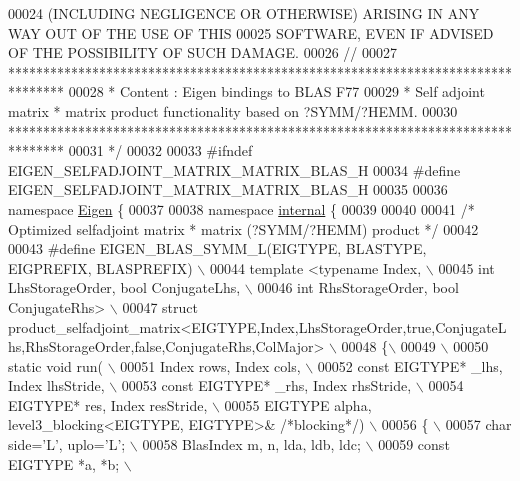 \begin{DoxyCode}
00024 \textcolor{comment}{ (INCLUDING NEGLIGENCE OR OTHERWISE) ARISING IN ANY WAY OUT OF THE USE OF THIS}
00025 \textcolor{comment}{ SOFTWARE, EVEN IF ADVISED OF THE POSSIBILITY OF SUCH DAMAGE.}
00026 \textcolor{comment}{//}
00027 \textcolor{comment}{ ********************************************************************************}
00028 \textcolor{comment}{ *   Content : Eigen bindings to BLAS F77}
00029 \textcolor{comment}{ *   Self adjoint matrix * matrix product functionality based on ?SYMM/?HEMM.}
00030 \textcolor{comment}{ ********************************************************************************}
00031 \textcolor{comment}{*/}
00032 
00033 \textcolor{preprocessor}{#ifndef EIGEN\_SELFADJOINT\_MATRIX\_MATRIX\_BLAS\_H}
00034 \textcolor{preprocessor}{#define EIGEN\_SELFADJOINT\_MATRIX\_MATRIX\_BLAS\_H}
00035 
00036 \textcolor{keyword}{namespace }\hyperlink{namespace_eigen}{Eigen} \{ 
00037 
00038 \textcolor{keyword}{namespace }\hyperlink{namespaceinternal}{internal} \{
00039 
00040 
00041 \textcolor{comment}{/* Optimized selfadjoint matrix * matrix (?SYMM/?HEMM) product */}
00042 
00043 \textcolor{preprocessor}{#define EIGEN\_BLAS\_SYMM\_L(EIGTYPE, BLASTYPE, EIGPREFIX, BLASPREFIX) \(\backslash\)}
00044 \textcolor{preprocessor}{template <typename Index, \(\backslash\)}
00045 \textcolor{preprocessor}{          int LhsStorageOrder, bool ConjugateLhs, \(\backslash\)}
00046 \textcolor{preprocessor}{          int RhsStorageOrder, bool ConjugateRhs> \(\backslash\)}
00047 \textcolor{preprocessor}{struct
       product\_selfadjoint\_matrix<EIGTYPE,Index,LhsStorageOrder,true,ConjugateLhs,RhsStorageOrder,false,ConjugateRhs,ColMajor> \(\backslash\)}
00048 \textcolor{preprocessor}{\{\(\backslash\)}
00049 \textcolor{preprocessor}{\(\backslash\)}
00050 \textcolor{preprocessor}{  static void run( \(\backslash\)}
00051 \textcolor{preprocessor}{    Index rows, Index cols, \(\backslash\)}
00052 \textcolor{preprocessor}{    const EIGTYPE* \_lhs, Index lhsStride, \(\backslash\)}
00053 \textcolor{preprocessor}{    const EIGTYPE* \_rhs, Index rhsStride, \(\backslash\)}
00054 \textcolor{preprocessor}{    EIGTYPE* res,        Index resStride, \(\backslash\)}
00055 \textcolor{preprocessor}{    EIGTYPE alpha, level3\_blocking<EIGTYPE, EIGTYPE>& }\textcolor{comment}{/*blocking*/}\textcolor{preprocessor}{) \(\backslash\)}
00056 \textcolor{preprocessor}{  \{ \(\backslash\)}
00057 \textcolor{preprocessor}{    char side='L', uplo='L'; \(\backslash\)}
00058 \textcolor{preprocessor}{    BlasIndex m, n, lda, ldb, ldc; \(\backslash\)}
00059 \textcolor{preprocessor}{    const EIGTYPE *a, *b; \(\backslash\)}

\end{DoxyCode}
